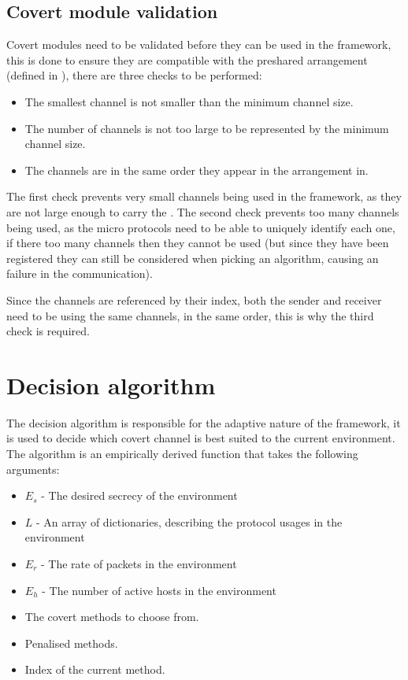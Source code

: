 \subsection{Covert module validation}

Covert modules need to be validated before they can be used in the framework, this is done to ensure they are compatible with the preshared arrangement (defined in ), there are three checks to be performed:

\begin{itemize}
    \item The smallest channel is not smaller than the minimum channel size.
    \item The number of channels is not too large to be represented by the minimum channel size.
    \item The channels are in the same order they appear in the arrangement in.
\end{itemize}

The first check prevents very small channels being used in the framework, as they are not large enough to carry the . The second check prevents too many channels being used, as the micro protocols need to be able to uniquely identify each one, if there too many channels then they cannot be used (but since they have been registered they can still be considered when picking an algorithm, causing an failure in the communication).

Since the channels are referenced by their index, both the sender and receiver need to be using the same channels, in the same order, this is why the third check is required.

\section{Decision algorithm}
\label{sec:decision_algorithm}

The decision algorithm is responsible for the adaptive nature of the framework, it is used to decide which covert channel is best suited to the current environment.
The algorithm is an empirically derived function that takes the following arguments:

\begin{itemize}
    \item $E_s$ - The desired secrecy of the environment
    \item $L$ - An array of dictionaries, describing the protocol usages in the environment
    \item $E_r$ - The rate of packets in the environment
    \item $E_h$ - The number of active hosts in the environment
    \item The covert methods to choose from.
    \item Penalised methods.
    \item Index of the current method.
\end{itemize}

